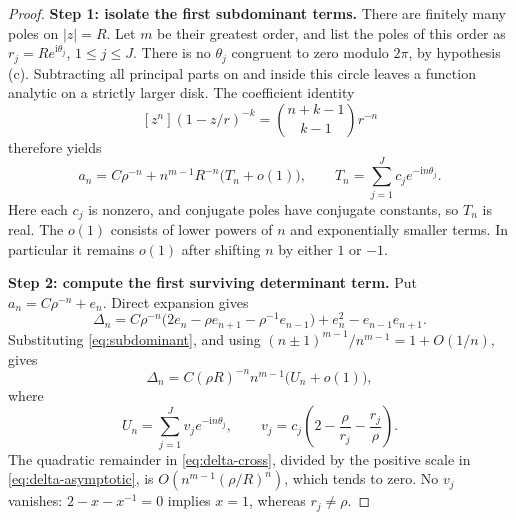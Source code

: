 \documentclass[11pt,letterpaper]{article}
\theoremstyle{definition}
\newcommand{\Delt}{\Delta}
\newcommand{\ii}{\mathrm i}
\numberwithin{equation}{section}
\begin{document}
\begin{proof}
\textbf{Step 1: isolate the first subdominant terms.}
There are finitely many poles on $|z|=R$. Let $m$ be their greatest
order, and list the poles of this order as
$r_j=Re^{\ii\theta_j}$, $1\le j\le J$. There is no $\theta_j$ congruent
to zero modulo $2\pi$, by hypothesis (c).
Subtracting all principal parts on and inside this circle leaves a
function analytic on a strictly larger disk. The coefficient identity
\[
[z^n](1-z/r)^{-k}=\binom{n+k-1}{k-1}r^{-n}
\]
therefore yields
\begin{equation}\label{eq:subdominant}
a_n=C\rho^{-n}+n^{m-1}R^{-n}\bigl(T_n+o(1)\bigr),
\qquad T_n=\sum_{j=1}^J c_je^{-\ii n\theta_j}.
\end{equation}
Here each $c_j$ is nonzero, and conjugate poles have conjugate constants,
so $T_n$ is real. The $o(1)$ consists of lower powers of $n$ and
exponentially smaller terms. In particular it remains $o(1)$ after
shifting $n$ by either $1$ or $-1$.

\textbf{Step 2: compute the first surviving determinant term.}
Put $a_n=C\rho^{-n}+e_n$. Direct expansion gives
\begin{equation}\label{eq:delta-cross}
\Delt_n=C\rho^{-n}
 \bigl(2e_n-\rho e_{n+1}-\rho^{-1}e_{n-1}\bigr)
 +e_n^2-e_{n-1}e_{n+1}.
\end{equation}
Substituting \eqref{eq:subdominant}, and using
$(n\pm1)^{m-1}/n^{m-1}=1+O(1/n)$, gives
\begin{equation}\label{eq:delta-asymptotic}
\Delt_n=C(\rho R)^{-n}n^{m-1}\bigl(U_n+o(1)\bigr),
\end{equation}
where
\begin{equation}\label{eq:U}
U_n=\sum_{j=1}^J v_je^{-\ii n\theta_j},
\qquad
v_j=c_j\left(2-\frac{\rho}{r_j}-\frac{r_j}{\rho}\right).
\end{equation}
The quadratic remainder in \eqref{eq:delta-cross}, divided by the
positive scale in \eqref{eq:delta-asymptotic}, is
$O(n^{m-1}(\rho/R)^n)$, which tends to zero.
No $v_j$ vanishes: $2-x-x^{-1}=0$ implies $x=1$, whereas
$r_j\ne\rho$.


\end{proof}
\end{document}
